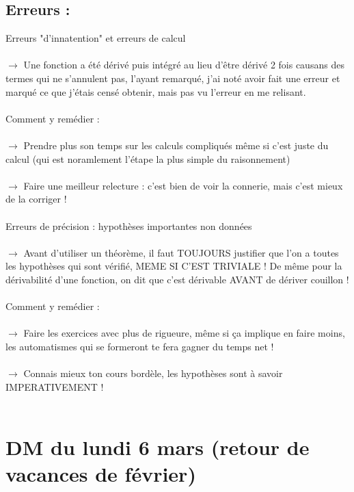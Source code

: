 \documentclass{book}
\begin{document}
\subsection{Erreurs :}

Erreurs "d'innatention" et erreurs de calcul \\ \\
$\rightarrow$ Une fonction a été dérivé puis intégré au lieu d'être dérivé 2 fois causans des termes qui ne s'annulent pas, l'ayant remarqué, j'ai noté avoir fait une erreur et marqué ce que j'étais censé obtenir, mais pas vu l'erreur en me relisant. \\ \\

Comment y remédier : \\ \\
$\rightarrow$ Prendre plus son temps sur les calculs compliqués même si c'est juste du calcul (qui est noramlement l'étape la plus simple du raisonnement) \\ \\
$\rightarrow$ Faire une meilleur relecture : c'est bien de voir la connerie, mais c'est mieux de la corriger ! \\ \\


Erreurs de précision : hypothèses importantes non données \\ \\
$\rightarrow$ Avant d'utiliser un théorème, il faut TOUJOURS justifier que l'on a toutes les hypothèses qui sont vérifié, MEME SI C'EST TRIVIALE ! De même pour la dérivabilité d'une fonction, on dit que c'est dérivable AVANT de dériver couillon ! \\ \\

Comment y remédier : \\ \\
$\rightarrow$ Faire les exercices avec plus de rigueure, même si ça implique en faire moins, les automatismes qui se formeront te fera gagner du temps net ! \\ \\
$\rightarrow$ Connais mieux ton cours bordèle, les hypothèses sont à savoir IMPERATIVEMENT ! \\ \\




\section{DM du lundi 6 mars (retour de vacances de février)}
\end{document}
